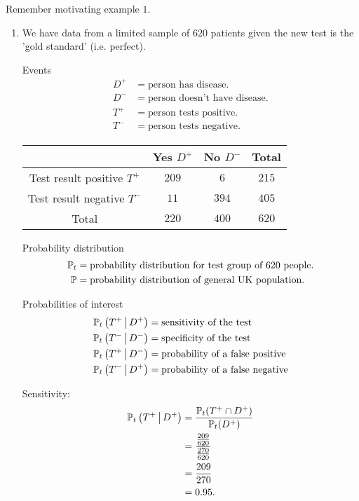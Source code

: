 \documentclass[10pt, a4paper]{article}
\begin{document}
Remember motivating example $1$.
\begin{enumerate}[label = (\roman*)]
    \item 
    We have data from a limited sample of $620$ patients given the new test is the 'gold standard'
    (i.e. perfect).

    Events
    \begin{align*}
        D ^ {+} &= \text{person has disease}. \\
        D ^ {-} &= \text{person doesn't have disease}. \\
        T ^ {+} &= \text{person tests positive}. \\
        T ^ {-} &= \text{person tests negative}.
    \end{align*}
    \begin{table}[H]
        \begin{tabular}{c|c|c|c}
             & Yes $D ^ {+}$ & No $D ^ {-}$ & Total \\
             \hline
             Test result positive $T ^ {+}$ & $209$ & $6$ & $215$ \\
             Test result negative $T ^ {-}$ & $11$ & $394$ & $405$ \\
             \hline
             Total & $220$ & $400$ & $620$
        \end{tabular}
    \end{table}

    Probability distribution
    \begin{align*}
        \P_t &= \text{probability distribution for test group of $620$ people}. \\
        \P &= \text{probability distribution of general UK population}.
    \end{align*}

    Probabilities of interest
    \begin{align*}
        \P_t\left(T ^ {+} \mmid D ^ {+}\right) &= \text{sensitivity of the test} \\
        \P_t\left(T ^ {-} \mmid D ^ {-}\right) &= \text{specificity of the test} \\
        \P_t\left(T ^ {+} \mmid D ^ {-}\right) &= \text{probability of a false positive} \\
        \P_t\left(T ^ {-} \mmid D ^ {+}\right) &= \text{probability of a false negative}
    \end{align*}

    Sensitivity:
    \begin{align*}
        \P_t\left(T ^ {+} \mmid D ^ {+}\right) &= \frac{\P_t(T ^ {+} \cap D ^ {+})}{\P_t(D ^ {+})} \\
        &= \frac{\frac{209}{620}}{\frac{270}{620}} \\
        &= \frac{209}{270} \\
        &= 0.95.
    \end{align*}


\end{enumerate}
\end{document}
